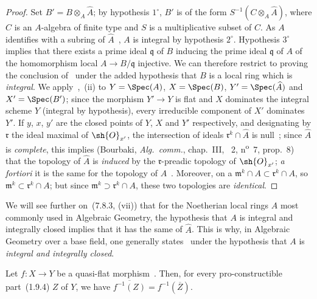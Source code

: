 \begin{proof}
Set $B'=B\otimes_A\widehat{A}$; by hypothesis $1^\circ$, $B'$ is of the form $S^{-1}(C\otimes_A\widehat{A})$, where $C$ is an $A$-algebra of finite type and $S$ is a multiplicative subset of $C$.
As $A$ identifies with a subring of $\widehat{A}$~, $A$ is integral by hypothesis $2^\circ$.
Hypothesis $3^\circ$ implies that there exists a prime ideal $\mathfrak{q}$ of $B$ inducing the prime ideal $\mathfrak{q}$ of $A$ of the homomorphism local $A\to B/\mathfrak{q}$ injective.
We can therefore restrict to proving the conclusion of~ under the added hypothesis that $B$ is a local ring which is \emph{integral}.
We apply~,~(ii) to $Y=\Spec(A)$, $X=\Spec(B)$, $Y'=\Spec(\widehat{A})$ and $X'=\Spec(B')$; since the morphism $Y'\to Y$ is flat and $X$ dominates the integral scheme $Y$ (integral by hypothesis), every irreducible component of $X'$ dominates $Y'$.
If $y$, $x$, $y'$ are the closed points of $Y$, $X$ and $Y'$ respectively, and designating by $\mathfrak{r}$ the ideal maximal of $\sh{O}_{x'}$, the intersection of ideals $\mathfrak{r}^k\cap\widehat{A}$ is null~; since $\widehat{A}$ is \emph{complete}, this implies (Bourbaki, \emph{Alg.~comm.}, chap.~III, \textsection~2, n\textsuperscript{o}~7, prop.~8) that the topology of $\widehat{A}$ is \emph{induced} by the $\mathfrak{r}$-preadic topology of $\sh{O}_{x'}$; \emph{a fortiori} it is the same for the topology of $A$~.
Moreover, on a $\mathfrak{m}^k\cap A\subset\mathfrak{r}^k\cap A$, so $\mathfrak{m}^k\subset\mathfrak{r}^k\cap A$; but since $\mathfrak{m}^k\supset\mathfrak{r}^k\cap A$, these two topologies are \emph{identical}.
\end{proof}

\begin{remark}[2.3.9]
\label{IV.2.3.9}
We will see further on~(7.8.3, (vii)) that for the Noetherian local rings $A$ most commonly used in Algebraic Geometry, the hypothesis that $A$ is integral and integrally closed implies that it has the same of $\widehat{A}$.
This is why, in Algebraic Geometry over a base field, one generally states~ under the hypothesis that $A$ is \emph{integral and integrally closed}.
\end{remark}

\begin{theorem}[2.3.10]
\label{IV.2.3.10}
Let $f:X\to Y$ be a quasi-flat morphism~.
Then, for every pro-constructible part~(1.9.4) $Z$ of $Y$, we have $\overline{f^{-1}(Z)}=f^{-1}(\overline{Z})$.
\end{theorem}

